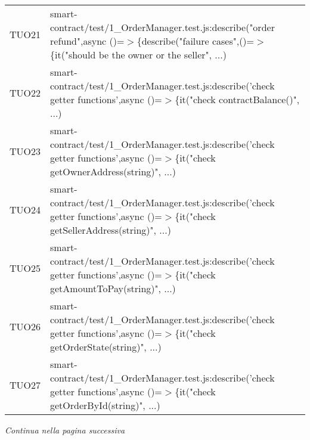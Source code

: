 \begin{table}[H]
\begin{tabular}{c|p{15cm}}
    TUO21 & smart-contract/test/1\_OrderManager.test.js:describe("order refund",\newline async ()=$>$\{describe("failure cases",()=$>$\{it("should be the owner or the seller", ...)                                                 \\
    TUO22 & smart-contract/test/1\_OrderManager.test.js:describe('check getter functions',\newline async ()=$>$\{it("check contractBalance()", ...)                                                                                       \\
    TUO23 & smart-contract/test/1\_OrderManager.test.js:describe('check getter functions',\newline async ()=$>$\{it("check getOwnerAddress(string)", ...)                                                                                    \\
    TUO24 & smart-contract/test/1\_OrderManager.test.js:describe('check getter functions',\newline async ()=$>$\{it("check getSellerAddress(string)", ...)                                                                                   \\
    TUO25 & smart-contract/test/1\_OrderManager.test.js:describe('check getter functions',\newline async ()=$>$\{it("check getAmountToPay(string)", ...)                                                                                     \\
    TUO26 & smart-contract/test/1\_OrderManager.test.js:describe('check getter functions',\newline async ()=$>$\{it("check getOrderState(string)", ...)                                                                                      \\
    TUO27 & smart-contract/test/1\_OrderManager.test.js:describe('check getter functions',\newline async ()=$>$\{it("check getOrderById(string)", ...)                                                                                      \\
  \end{tabular}
\end{table}
\begin{center}
  \textit{\small Continua nella pagina successiva}
\end{center}
